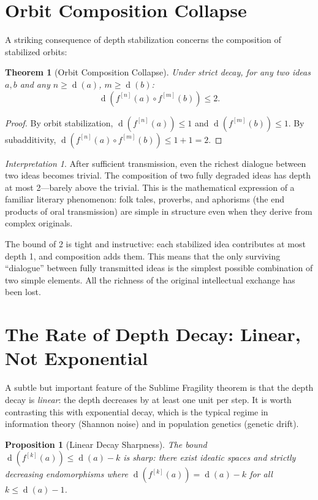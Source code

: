 \documentclass[11pt,openany]{book}
\theoremstyle{definition}
\theoremstyle{plain}
\newtheorem{theorem}[axiom]{Theorem}
\newtheorem{proposition}[axiom]{Proposition}
\theoremstyle{remark}
\newtheorem{interpretation}[axiom]{Interpretation}
\newcommand{\compose}{\circ}                 %
\newcommand{\depth}{\operatorname{d}}       %
\begin{document}
\section{Orbit Composition Collapse}

A striking consequence of depth stabilization concerns the composition of stabilized orbits:

\begin{theorem}[Orbit Composition Collapse]
\label{thm:orbit-collapse}
Under strict decay, for any two ideas $a, b$ and any $n \geq \depth(a)$, $m \geq \depth(b)$:
\[
\depth(f^{[n]}(a) \compose f^{[m]}(b)) \leq 2.
\]
\end{theorem}

\begin{proof}
By orbit stabilization, $\depth(f^{[n]}(a)) \leq 1$ and $\depth(f^{[m]}(b)) \leq 1$. By subadditivity, $\depth(f^{[n]}(a) \compose f^{[m]}(b)) \leq 1 + 1 = 2$.
\end{proof}

\begin{interpretation}
After sufficient transmission, even the richest dialogue between two ideas becomes trivial. The composition of two fully degraded ideas has depth at most 2---barely above the trivial. This is the mathematical expression of a familiar literary phenomenon: folk tales, proverbs, and aphorisms (the end products of oral transmission) are simple in structure even when they derive from complex originals.

The bound of 2 is tight and instructive: each stabilized idea contributes at most depth 1, and composition adds them. This means that the only surviving ``dialogue'' between fully transmitted ideas is the simplest possible combination of two simple elements. All the richness of the original intellectual exchange has been lost.
\end{interpretation}

\section{The Rate of Depth Decay: Linear, Not Exponential}

A subtle but important feature of the Sublime Fragility theorem is that the depth decay is \emph{linear}: the depth decreases by at least one unit per step. It is worth contrasting this with exponential decay, which is the typical regime in information theory (Shannon noise) and in population genetics (genetic drift).

\begin{proposition}[Linear Decay Sharpness]
The bound $\depth(f^{[k]}(a)) \leq \depth(a) - k$ is sharp: there exist ideatic spaces and strictly decreasing endomorphisms where $\depth(f^{[k]}(a)) = \depth(a) - k$ for all $k \leq \depth(a) - 1$.
\end{proposition}
\end{document}
